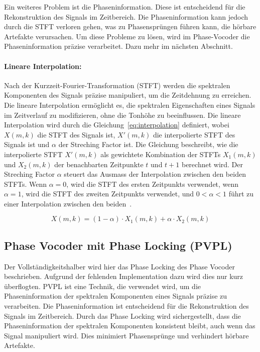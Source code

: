 Ein weiteres Problem ist die Phaseninformation. Diese ist entscheidend für die Rekonstruktion des Signals im Zeitbereich. Die Phaseninformation kann jedoch durch die STFT verloren gehen, was zu Phasensprüngen führen kann, die hörbare Artefakte verursachen. Um diese Probleme zu lösen, wird im Phase-Vocoder die Phaseninformation präzise verarbeitet. Dazu mehr im nächsten Abschnitt.

\paragraph{Lineare Interpolation:}
Nach der Kurzzeit-Fourier-Transformation (STFT) werden die spektralen Komponenten des Signals präzise manipuliert, um die Zeitdehnung zu erreichen. Die lineare Interpolation ermöglicht es, die spektralen Eigenschaften eines Signals im Zeitverlauf zu modifizieren, ohne die Tonhöhe zu beeinflussen. Die lineare Interpolation wird durch die Gleichung~\eqref{eq:interpolation} definiert, wobei \( X(m, k) \) die STFT des Signals ist, \( X'(m, k) \) die interpolierte STFT des Signals ist und \( \alpha \) der Streching Factor ist. Die Gleichung beschreibt, wie die interpolierte STFT \( X'(m, k) \) als gewichtete Kombination der STFTs \( X_1(m, k) \) und \( X_2(m, k) \) der benachbarten Zeitpunkte \( t \) und \( t + 1 \) berechnet wird. Der Streching Factor \( \alpha \) steuert das Ausmass der Interpolation zwischen den beiden STFTs. Wenn \( \alpha = 0 \), wird die STFT des ersten Zeitpunkts verwendet, wenn \( \alpha = 1 \), wird die STFT des zweiten Zeitpunkts verwendet, und \( 0 < \alpha < 1 \) führt zu einer Interpolation zwischen den beiden~\cite{Lazzarini2019ComputerMI}.

\begin{equation}
    \label{eq:interpolation}
    X(m, k) = (1 - \alpha) \cdot X_1(m, k) + \alpha \cdot X_2(m, k)
\end{equation}

\subsection{Phase Vocoder mit Phase Locking (PVPL)}
Der Vollständigkeitshalber wird hier das Phase Locking des Phase Vocoder beschrieben. Aufgrund der fehlenden Implementation dazu wird dies nur kurz überflogten. PVPL ist eine Technik, die verwendet wird, um die Phaseninformation der spektralen Komponenten eines Signals präzise zu verarbeiten. Die Phaseninformation ist entscheidend für die Rekonstruktion des Signals im Zeitbereich. Durch das Phase Locking wird sichergestellt, dass die Phaseninformation der spektralen Komponenten konsistent bleibt, auch wenn das Signal manipuliert wird. Dies minimiert Phasensprünge und verhindert hörbare Artefakte\cite{Driedger2016ARO}.

